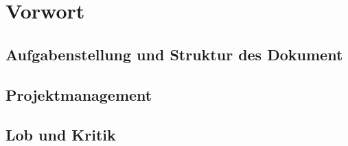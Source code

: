 \chapter{Vorwort}
\section{Aufgabenstellung und Struktur des Dokument}
\section{Projektmanagement}
\section{Lob und Kritik}